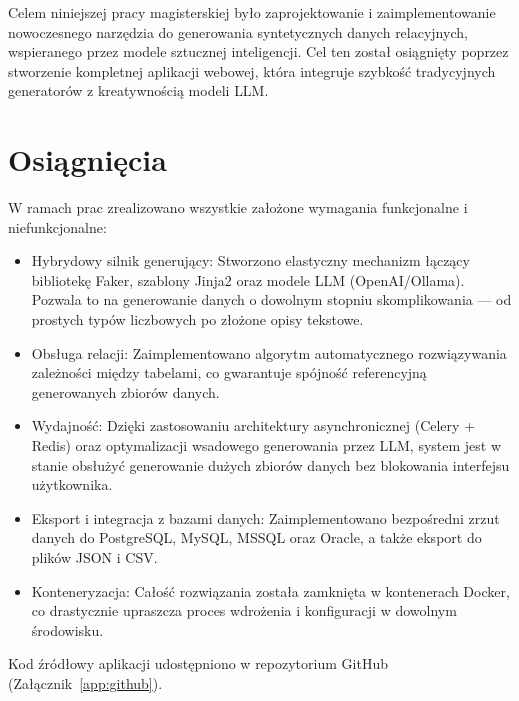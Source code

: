 Celem niniejszej pracy magisterskiej było zaprojektowanie i zaimplementowanie nowoczesnego narzędzia do generowania syntetycznych danych relacyjnych, wspieranego przez modele sztucznej inteligencji. Cel ten został osiągnięty poprzez stworzenie kompletnej aplikacji webowej, która integruje szybkość tradycyjnych generatorów z kreatywnością modeli \gls{LLM}.

\section{Osiągnięcia}
W ramach prac zrealizowano wszystkie założone wymagania funkcjonalne i niefunkcjonalne:
\begin{itemize}
    \item Hybrydowy silnik generujący: Stworzono elastyczny mechanizm łączący bibliotekę Faker, szablony Jinja2 oraz modele \gls{LLM} (OpenAI/Ollama). Pozwala to na generowanie danych o dowolnym stopniu skomplikowania --- od prostych typów liczbowych po złożone opisy tekstowe.
    \item Obsługa relacji: Zaimplementowano algorytm automatycznego rozwiązywania zależności między tabelami, co gwarantuje spójność referencyjną generowanych zbiorów danych.
    \item Wydajność: Dzięki zastosowaniu architektury asynchronicznej (Celery + Redis) oraz optymalizacji wsadowego generowania przez \gls{LLM}, system jest w stanie obsłużyć generowanie dużych zbiorów danych bez blokowania interfejsu użytkownika.
    \item Eksport i integracja z bazami danych: Zaimplementowano bezpośredni zrzut danych do PostgreSQL, MySQL, MSSQL oraz Oracle, a także eksport do plików \gls{JSON} i \gls{CSV}.
    \item Konteneryzacja: Całość rozwiązania została zamknięta w kontenerach Docker, co drastycznie upraszcza proces wdrożenia i konfiguracji w dowolnym środowisku.
\end{itemize}

Kod źródłowy aplikacji udostępniono w repozytorium GitHub (Załącznik~\ref{app:github}).

